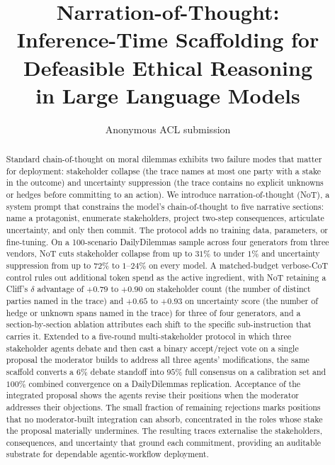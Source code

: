 \documentclass[11pt]{article}
\title{Narration-of-Thought:\\
Inference-Time Scaffolding for Defeasible Ethical Reasoning\\
in Large Language Models}
\author{Anonymous ACL submission}
\begin{document}
\maketitle

\begin{abstract}
Standard chain-of-thought on moral dilemmas exhibits two failure modes
that matter for deployment: stakeholder collapse (the trace names at
most one party with a stake in the outcome) and uncertainty
suppression (the trace contains no explicit unknowns or hedges before
committing to an action). We introduce narration-of-thought
(NoT), a system prompt that constrains the model's chain-of-thought
to five narrative sections: name a protagonist, enumerate
stakeholders, project two-step consequences, articulate uncertainty,
and only then commit. The protocol adds no training data, parameters,
or fine-tuning. On a 100-scenario DailyDilemmas sample across four
generators from three vendors, NoT cuts stakeholder collapse from
up to $31\%$ to under $1\%$ and uncertainty suppression from up to
$72\%$ to $1$--$24\%$ on every model. A matched-budget verbose-CoT
control rules out additional token spend as the active ingredient,
with NoT retaining a Cliff's $\delta$ advantage of $+0.79$ to
$+0.90$ on stakeholder count (the number of distinct parties named in
the trace) and $+0.65$ to $+0.93$ on uncertainty score (the number of
hedge or unknown spans named in the trace) for three of four
generators, and a section-by-section ablation attributes each shift
to the specific sub-instruction that carries it. Extended to a
five-round multi-stakeholder protocol in which three stakeholder
agents debate and then cast a binary accept/reject vote on a single
proposal the moderator builds to address all three agents'
modifications, the same scaffold converts a $6\%$ debate standoff
into $95\%$ full consensus on a calibration set and $100\%$ combined
convergence on a DailyDilemmas replication. Acceptance of the
integrated proposal shows the agents revise their positions when the
moderator addresses their objections. The small fraction of remaining
rejections marks positions that no moderator-built integration can
absorb, concentrated in the roles whose stake the proposal materially
undermines. The resulting traces externalise the stakeholders,
consequences, and uncertainty that ground each commitment, providing
an auditable substrate for dependable agentic-workflow deployment.
\end{abstract}
\end{document}
